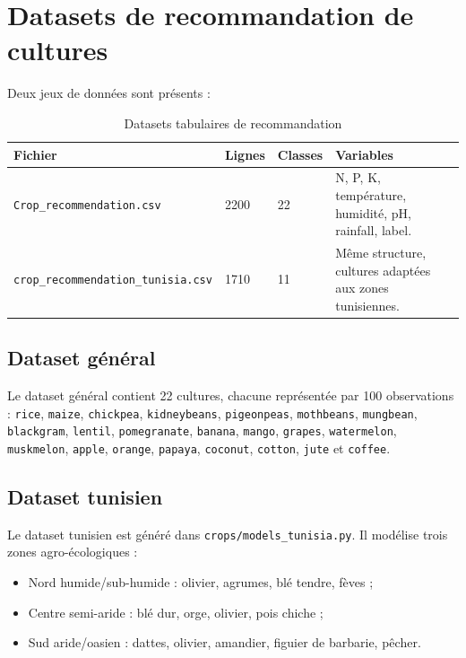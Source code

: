 \documentclass[12pt,a4paper]{report}
\begin{document}
\section{Datasets de recommandation de cultures}
Deux jeux de données sont présents :
\begin{table}[H]
\centering
\caption{Datasets tabulaires de recommandation}
\begin{tabular}{p{4.2cm}p{2cm}p{2cm}p{5.2cm}}
\toprule
\textbf{Fichier} & \textbf{Lignes} & \textbf{Classes} & \textbf{Variables} \\
\midrule
\texttt{Crop\_recommendation.csv} & 2200 & 22 & N, P, K, température, humidité, pH, rainfall, label. \\
\texttt{crop\_recommendation\_tunisia.csv} & 1710 & 11 & Même structure, cultures adaptées aux zones tunisiennes. \\
\bottomrule
\end{tabular}
\end{table}

\subsection{Dataset général}
Le dataset général contient 22 cultures, chacune représentée par 100 observations : \texttt{rice}, \texttt{maize}, \texttt{chickpea}, \texttt{kidneybeans}, \texttt{pigeonpeas}, \texttt{mothbeans}, \texttt{mungbean}, \texttt{blackgram}, \texttt{lentil}, \texttt{pomegranate}, \texttt{banana}, \texttt{mango}, \texttt{grapes}, \texttt{watermelon}, \texttt{muskmelon}, \texttt{apple}, \texttt{orange}, \texttt{papaya}, \texttt{coconut}, \texttt{cotton}, \texttt{jute} et \texttt{coffee}.

\subsection{Dataset tunisien}
Le dataset tunisien est généré dans \texttt{crops/models\_tunisia.py}. Il modélise trois zones agro-écologiques :
\begin{itemize}[noitemsep]
  \item Nord humide/sub-humide : olivier, agrumes, blé tendre, fèves ;
  \item Centre semi-aride : blé dur, orge, olivier, pois chiche ;
  \item Sud aride/oasien : dattes, olivier, amandier, figuier de barbarie, pêcher.
\end{itemize}
\end{document}
